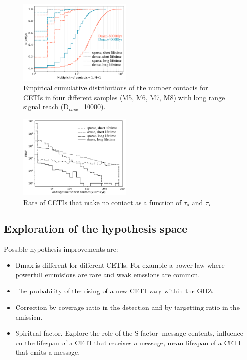 \documentclass[crop]{CSLB}%
\begin{document}
                 
\begin{figure} \centering
   \includegraphics[width=0.5\textwidth]{F1.pdf}
   \caption{Empirical cumulative distributions of the number contacts
   for CETIs in four different samples (M5, M6, M7, M8) with long
   range signal reach (D$_{max}$=10000).
   }
\label{F_number_of_contacts} \end{figure}
   
\begin{figure} %
   \centering
   \includegraphics[width=0.5\textwidth]{F2.pdf}
   \caption{Rate of CETIs that make no contact as a function of
   $\tau_a$ and $\tau_s$}
   \label{F_waiting_time}
\end{figure}                       
 


\subsection{Exploration of the hypothesis space}                    

Possible hypothesis improvements are:

\begin{itemize}
   \item Dmax is different for different CETIs.  For example a power
      law where powerfull emmisions are rare and weak emssions are
      common.
   \item The probability of the rising of a new CETI vary within the
      GHZ.
   \item Correction by coverage ratio in the detection and by
      targetting ratio in the emission.
   \item Spiritual factor.  Explore the role of the S factor: message
      contents, influence on the lifespan of a CETI that receives a
      message, mean lifespan of a CETI that emits a message.
\end{itemize}
\end{document}
